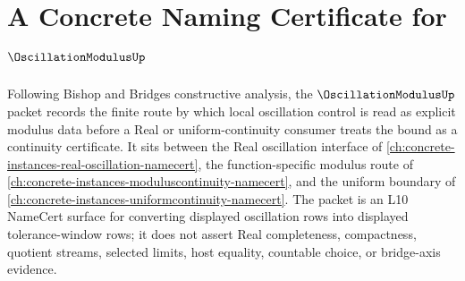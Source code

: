 \chapter{A Concrete Naming Certificate for $\OscillationModulusUp$}
\label{ch:concrete-instances-oscillation-modulus-namecert}

Following Bishop and Bridges constructive analysis, the $\OscillationModulusUp$ packet records the finite route by which local oscillation control is read as explicit modulus data before a Real or uniform-continuity consumer treats the bound as a continuity certificate. It sits between the Real oscillation interface of \autoref{ch:concrete-instances-real-oscillation-namecert}, the function-specific modulus route of \autoref{ch:concrete-instances-moduluscontinuity-namecert}, and the uniform boundary of \autoref{ch:concrete-instances-uniformcontinuity-namecert}. The packet is an L10 NameCert surface for converting displayed oscillation rows into displayed tolerance-window rows; it does not assert Real completeness, compactness, quotient streams, selected limits, host equality, countable choice, or bridge-axis evidence.

